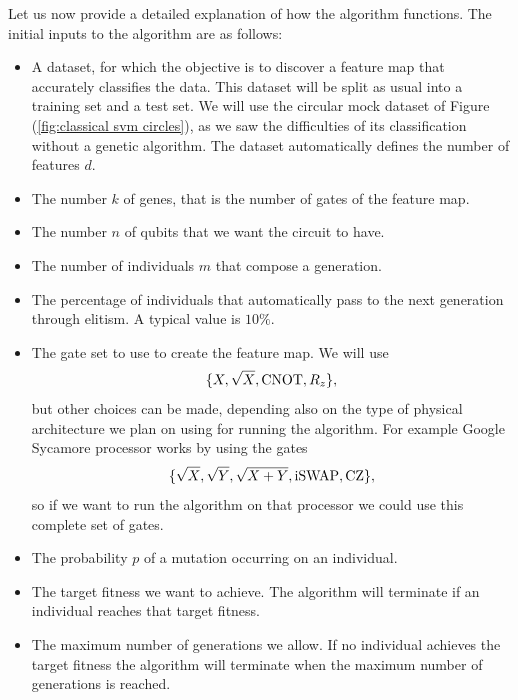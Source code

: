 \documentclass[12pt]{article}
\begin{document}
Let us now provide a detailed explanation of how the algorithm functions. The initial inputs to the algorithm are as follows:
\begin{itemize} 
    \item A dataset, for which the objective is to discover a feature map that accurately classifies the data. This dataset will be split as usual into a training set and a test set. We will use the circular mock dataset of Figure (\ref{fig:classical svm circles}), as we saw the difficulties of its classification without a genetic algorithm. The dataset automatically defines the number of features $d$.  
    \item The number $k$ of genes, that is the number of gates of the feature map. 
    \item The number $n$ of qubits that we want the circuit to have.
    \item The number of individuals $m$ that compose a generation.
    \item The percentage of individuals that automatically pass to the next generation through elitism. A typical value is $10\%$.
    \item The gate set to use to create the feature map. We will use $$\{X, \sqrt{X}, \textup{CNOT}, R_z\},$$ but other choices can be made, depending also on the type of physical architecture we plan on using for running the algorithm. For example Google Sycamore processor works by using the gates $$\{\sqrt{X}, \sqrt{Y},\sqrt{X+Y}, \textup{iSWAP}, \text{CZ}\},$$ so if we want to run the algorithm on that processor we could use this complete set of gates. 
    \item The probability $p$ of a mutation occurring on an individual.
    \item The target fitness we want to achieve. The algorithm will terminate if an individual reaches that target fitness. 
    \item The maximum number of generations we allow. If no individual achieves the target fitness the algorithm will terminate when the maximum number of generations is reached. 
\end{itemize}
\end{document}
